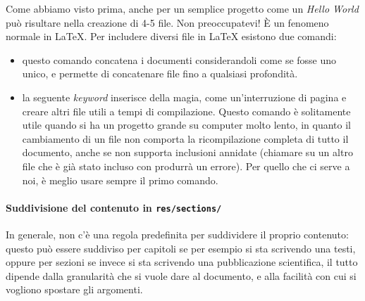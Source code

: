 Come abbiamo visto prima, anche per un semplice progetto come un \textit{Hello
World} può risultare nella creazione di 4-5 file. Non preoccupatevi! È un
fenomeno normale in \LaTeX{}.
Per includere diversi file in \LaTeX{} esistono due comandi:
\begin{itemize}
 \item \verb!! questo comando concatena i documenti considerandoli
come se fosse uno unico, e permette di concatenare file fino a qualsiasi
profondità.
 \item \verb!! la seguente \textit{keyword} inserisce della magia,
come un'interruzione di pagina e creare altri file utili a tempi di
compilazione. Questo comando è solitamente utile quando si ha un progetto
grande su computer molto lento, in quanto il cambiamento di un file non
comporta la ricompilazione completa di tutto il documento, anche se non
supporta inclusioni annidate (chiamare \verb!! su un altro file che
è già stato incluso con \verb!! produrrà un errore). Per quello che
ci serve a noi, è meglio usare sempre il primo comando.
\end{itemize}

\paragraph*{Suddivisione del contenuto in \texttt{res/sections/}} In generale,
non c'è una regola predefinita per suddividere il proprio contenuto: questo può
essere suddiviso per capitoli se per esempio si sta scrivendo una testi, oppure
per sezioni se invece si sta scrivendo una pubblicazione scientifica, il tutto
dipende dalla granularità che si vuole dare al documento, e alla facilità con
cui si vogliono spostare gli argomenti.
